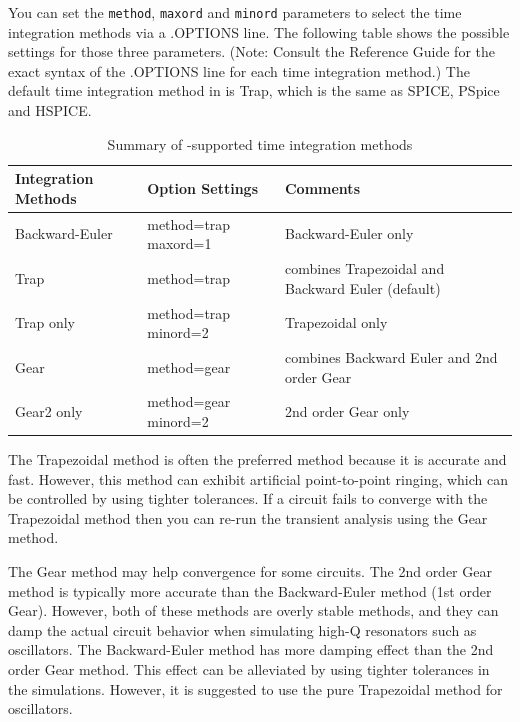 You can set the \verb|method|, \verb|maxord| and \verb|minord|
parameters to select the time integration methods via a .OPTIONS
line. The following table shows the possible settings for those three
parameters. (Note: Consult the \Xyce{} Reference Guide\ReferenceGuide
for the exact syntax of the .OPTIONS line for each time integration
method.) The default time integration method in \Xyce{} is Trap, which
is the same as SPICE, PSpice and HSPICE.

\begin{table}[htbp]
  \caption{Summary of \Xyce{}-supported time integration methods \label{Time_integration}}
  \begin{tabularx}{\linewidth}{|Y|Y|Y|}
     \color{white}\bf  Integration Methods &
    \color{white}\bf  Option Settings & \color{white}\bf Comments \\ \hline
    Backward-Euler & method=trap maxord=1 & Backward-Euler only \\ \hline
    Trap & method=trap & combines Trapezoidal and Backward Euler (default) \\ \hline
    Trap only & method=trap minord=2 & Trapezoidal only \\ \hline
    Gear &  method=gear &  combines Backward Euler and 2nd order Gear \\ \hline
    Gear2 only &  method=gear minord=2 & 2nd order Gear only  \\ \hline
  \end{tabularx}
  
\end{table}



The Trapezoidal method is often the preferred method because it is
accurate and fast.  However, this method can exhibit artificial
point-to-point ringing, which can be controlled by using tighter
tolerances. If a circuit fails to converge with the Trapezoidal method
then you can re-run the transient analysis using the Gear method.

The Gear method may help convergence for some circuits. The 2nd order
Gear method is typically more accurate than the Backward-Euler method
(1st order Gear). However, both of these methods are overly stable
methods, and they can damp the actual circuit behavior when simulating
high-Q resonators such as oscillators.  The Backward-Euler method has
more damping effect than the 2nd order Gear method.  This effect can
be alleviated by using tighter tolerances in the simulations. However,
it is suggested to use the pure Trapezoidal method for oscillators.

